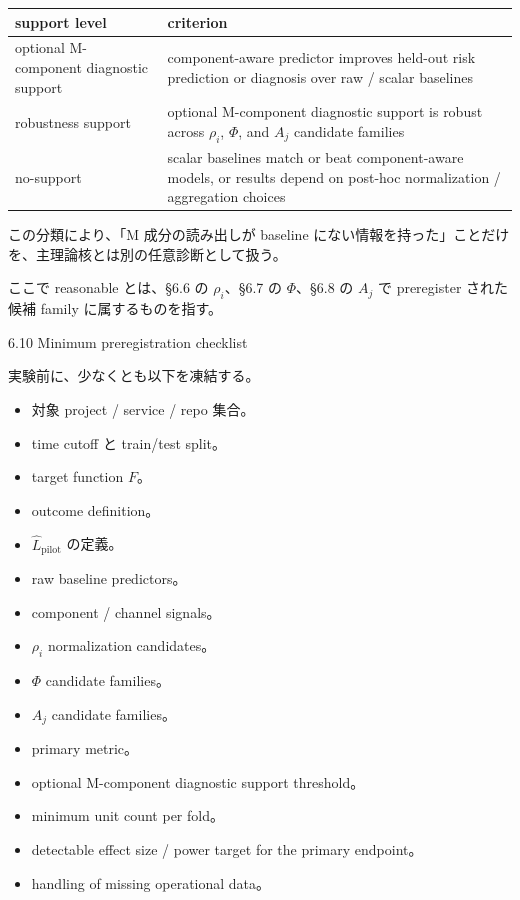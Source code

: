 \documentclass[12pt,a4paper]{article}
\begin{document}
{\def\LTcaptype{table} %
\begin{longtable}[]{@{}
  >{\raggedright\arraybackslash}p{}
  >{\raggedright\arraybackslash}p{}@{}}
\toprule\noalign{}
\begin{minipage}[b]{\linewidth}\raggedright
support level
\end{minipage} & \begin{minipage}[b]{\linewidth}\raggedright
criterion
\end{minipage} \\
\midrule\noalign{}
\endhead
\bottomrule\noalign{}
\endlastfoot
optional M-component diagnostic support & component-aware predictor improves held-out risk prediction or diagnosis over raw / scalar baselines \\
robustness support & optional M-component diagnostic support is robust across \(\rho_i\), \(\Phi\), and \(A_j\) candidate families \\
no-support & scalar baselines match or beat component-aware models, or results depend on post-hoc normalization / aggregation choices \\
\end{longtable}
}

この分類により、「M 成分の読み出しが baseline にない情報を持った」ことだけを、主理論核とは別の任意診断として扱う。

ここで reasonable とは、§6.6 の \(\rho_i\)、§6.7 の \(\Phi\)、§6.8 の \(A_j\) で preregister された候補 family に属するものを指す。

6.10 Minimum preregistration checklist

実験前に、少なくとも以下を凍結する。

\begin{itemize}
\tightlist
\item
  対象 project / service / repo 集合。
\item
  time cutoff と train/test split。
\item
  target function \(F\)。
\item
  outcome definition。
\item
  \(\hat L_{\mathrm{pilot}}\) の定義。
\item
  raw baseline predictors。
\item
  component / channel signals。
\item
  \(\rho_i\) normalization candidates。
\item
  \(\Phi\) candidate families。
\item
  \(A_j\) candidate families。
\item
  primary metric。
\item
  optional M-component diagnostic support threshold。
\item
  minimum unit count per fold。
\item
  detectable effect size / power target for the primary endpoint。
\item
  handling of missing operational data。
\end{itemize}
\end{document}
